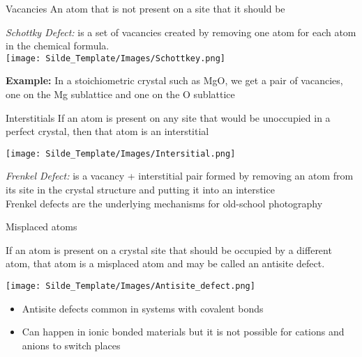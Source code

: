 \documentclass{libs/XJTLU_format}
\begin{document}
\begin{frame}{Vacancies}
An atom that is not present on a site that it should be\\[0.3cm]\pause

\emph{Schottky Defect:} is a set of vacancies created by removing one atom for each atom in the chemical formula.\\[0.3cm]

\centering
\texttt{[image: Silde\_Template/Images/Schottkey.png]} \\[0.3cm] \pause

\justifying
\textbf{Example:} In a stoichiometric crystal such as MgO, we get a pair of vacancies, one on the Mg sublattice and one on the O sublattice
    
\end{frame}
    
\begin{frame}{Interstitials}
If an atom is present on any site that would be unoccupied in a perfect crystal, then that atom is an interstitial \\[0.3cm]\pause

\centering
\texttt{[image: Silde\_Template/Images/Intersitial.png]} \\[0.3cm] \pause

\justifying
\emph{Frenkel Defect:} is a vacancy + interstitial pair formed by removing an atom from its site in the crystal structure and putting it into an interstice\\[0.3cm]

\pause
\justifying
Frenkel defects are the underlying mechanisms for old-school photography
    
\end{frame}

\begin{frame}{Misplaced atoms}

If an atom is present on a crystal site that should be occupied by a different atom, \pause that atom is a misplaced atom and may be called an antisite defect. \\[0.3cm]\pause

\centering
\texttt{[image: Silde\_Template/Images/Antisite\_defect.png]} \\[0.3cm] \pause

\begin{itemize}
    \item Antisite defects common in systems with covalent bonds \pause
    \item Can happen in ionic bonded materials but it is not possible for cations and anions to switch places
\end{itemize}

\end{frame}
\end{document}

